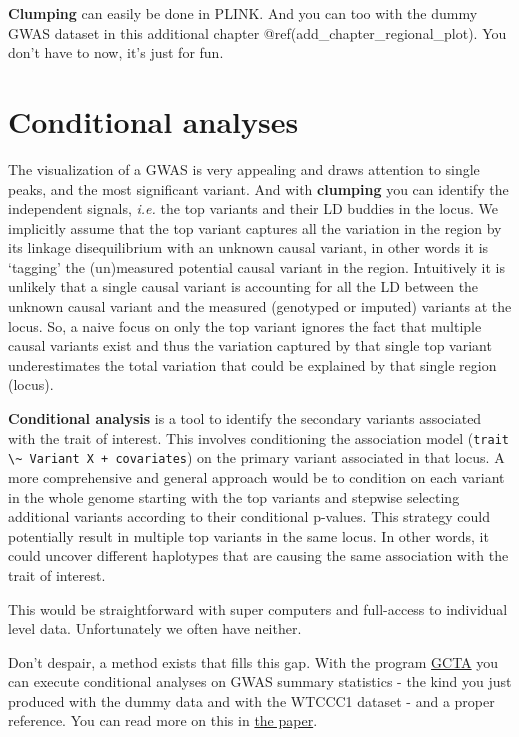\documentclass[
]{book}
\newcommand{\passthrough}[1]{#1}
\begin{document}
\textbf{Clumping} can easily be done in PLINK. And you can too with the dummy GWAS dataset in this additional chapter @ref(add\_chapter\_regional\_plot). You don't have to now, it's just for fun.

\hypertarget{conditional-analyses}{%
\section{Conditional analyses}\label{conditional-analyses}}

The visualization of a GWAS is very appealing and draws attention to single peaks, and the most significant variant. And with \textbf{clumping} you can identify the independent signals, \emph{i.e.} the top variants and their LD buddies in the locus. We implicitly assume that the top variant captures all the variation in the region by its linkage disequilibrium with an unknown causal variant, in other words it is `tagging' the (un)measured potential causal variant in the region. Intuitively it is unlikely that a single causal variant is accounting for all the LD between the unknown causal variant and the measured (genotyped or imputed) variants at the locus. So, a naive focus on only the top variant ignores the fact that multiple causal variants exist and thus the variation captured by that single top variant underestimates the total variation that could be explained by that single region (locus).

\textbf{Conditional analysis} is a tool to identify the secondary variants associated with the trait of interest. This involves conditioning the association model (\passthrough{\lstinline!trait \~ Variant X + covariates!}) on the primary variant associated in that locus. A more comprehensive and general approach would be to condition on each variant in the whole genome starting with the top variants and stepwise selecting additional variants according to their conditional p-values. This strategy could potentially result in multiple top variants in the same locus. In other words, it could uncover different haplotypes that are causing the same association with the trait of interest.

This would be straightforward with super computers and full-access to individual level data. Unfortunately we often have neither.

Don't despair, a method exists that fills this gap. With the program \href{http://cnsgenomics.com/software/gcta/\#Overview}{GCTA} you can execute conditional analyses on GWAS summary statistics - the kind you just produced with the dummy data and with the WTCCC1 dataset - and a proper reference. You can read more on this in \href{https://www.nature.com/articles/ng.2213}{the paper}.
\end{document}
